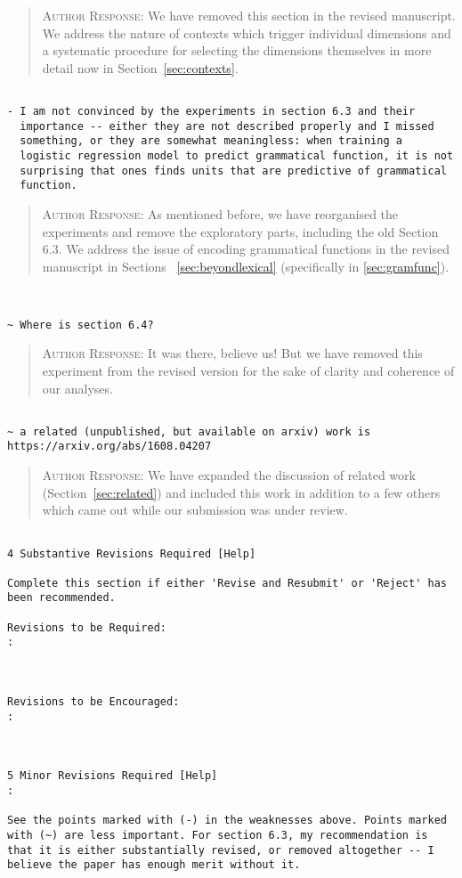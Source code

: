 \begin{quote}
\textsc{Author Response:} We have removed this section in the revised manuscript. We 
address the nature of contexts which trigger individual dimensions and a systematic
procedure for selecting the dimensions themselves in more detail now in 
Section~\ref{sec:contexts}.
\end{quote}
\begin{verbatim}

- I am not convinced by the experiments in section 6.3 and their
  importance -- either they are not described properly and I missed
  something, or they are somewhat meaningless: when training a
  logistic regression model to predict grammatical function, it is not
  surprising that ones finds units that are predictive of grammatical
  function.
\end{verbatim}  
\begin{quote}
\textsc{Author Response:}  As mentioned before, we have reorganised 
the experiments and remove the exploratory parts, including the old Section 6.3. 
We address the issue of encoding grammatical functions in the revised manuscript in 
Sections ~\ref{sec:beyondlexical} (specifically in \ref{sec:gramfunc}).
\end{quote}
\begin{verbatim}


~ Where is section 6.4?

\end{verbatim}  
\begin{quote}
\textsc{Author Response:} It was there, believe us! But we have removed this 
experiment from the revised version for the sake of clarity and coherence of our analyses.
\end{quote}
\begin{verbatim}

~ a related (unpublished, but available on arxiv) work is
https://arxiv.org/abs/1608.04207

\end{verbatim}  
\begin{quote}
\textsc{Author Response:}  We have expanded the discussion of related work 
(Section~\ref{sec:related}) and included this work in addition to a few others which 
came out while our submission was under review.
\end{quote}
\begin{verbatim}

4 Substantive Revisions Required [Help]

Complete this section if either 'Revise and Resubmit' or 'Reject' has
been recommended.

Revisions to be Required:
: 



Revisions to be Encouraged:
: 



5 Minor Revisions Required [Help]
:

See the points marked with (-) in the weaknesses above. Points marked
with (~) are less important. For section 6.3, my recommendation is
that it is either substantially revised, or removed altogether -- I
believe the paper has enough merit without it.

\end{verbatim}  
